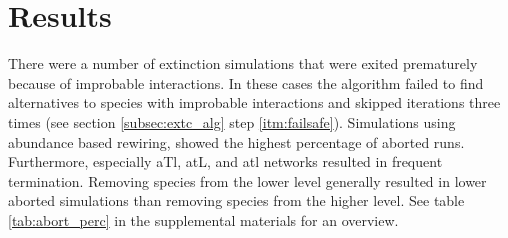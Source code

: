 \documentclass[12pt,a4paper]{article}
\begin{document}
\section{Results}
There were a number of extinction simulations that were exited prematurely because of improbable interactions. In these cases the algorithm failed to find alternatives to species with improbable interactions and skipped iterations three times (see section \ref{subsec:extc_alg} step \ref{itm:failsafe}). Simulations using abundance based rewiring, showed the highest percentage of aborted runs. Furthermore, especially aTl, atL, and atl networks resulted in frequent termination. Removing species from the lower level generally resulted in lower aborted simulations than removing species from the higher level. See table \ref{tab:abort_perc} in the supplemental materials for an overview. \paragraph{}
\end{document}
